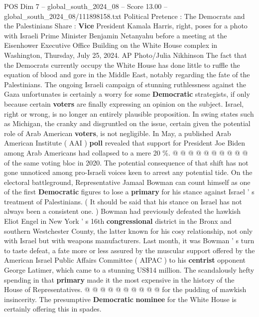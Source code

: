 \begin{textsample}{POS Dim 7 – global\_south\_2024\_08 – Score 13.00 – global\_south\_2024\_08/111898158.txt}  \label{ex:f7_pos_180}
Political Pretence : The Democrats and the Palestinians Share : \textbf{Vice} President Kamala Harris, right, poses for a photo with Israeli Prime Minister Benjamin Netanyahu before a meeting at the Eisenhower Executive Office Building on the White House complex in Washington, Thursday, July 25, 2024.
AP Photo/Julia Nikhinson The fact that the Democrats currently occupy the White House has done little to ruffle the equation of blood and gore in the Middle East, notably regarding the fate of the Palestinians.
The ongoing Israeli campaign of stunning ruthlessness against the Gaza unfortunates is certainly a worry for some \textbf{Democratic} strategists, if only because certain \textbf{voters} are finally expressing an opinion on the subject.
Israel, right or wrong, is no longer an entirely plausible proposition.
In swing states such as Michigan, the cranky and disgruntled on the issue, certain given the potential role of Arab American \textbf{voters}, is not negligible.
In May, a published Arab American Institute ( AAI ) \textbf{poll} revealed that support for President Joe Biden among Arab Americans had collapsed to a mere 20 \%. @ @ @ @ @ @ @ @ @ @ of the same voting bloc in 2020.
The potential consequence of that shift has not gone unnoticed among pro-Israeli voices keen to arrest any potential tide.
On the electoral battleground, Representative Jamaal Bowman can count himself as one of the first \textbf{Democratic} figures to lose a \textbf{primary} for his stance against Israel ' s treatment of Palestinians. ( It should be said that his stance on Israel has not always been a consistent one. ) Bowman had previously defeated the hawkish Eliot Engel in New York ' s 16th \textbf{congressional} district in the Bronx and southern Westchester County, the latter known for his cosy relationship, not only with Israel but with weapons manufacturers.
Last month, it was Bowman ' s turn to taste defeat, a fate more or less assured by the muscular support offered by the American Israel Public Affairs Committee ( AIPAC ) to his \textbf{centrist} opponent George Latimer, which came to a stunning US\$14 million.
The scandalously hefty spending in that \textbf{primary} made it the most expensive in the history of the House of Representatives. @ @ @ @ @ @ @ @ @ @ for the pudding of mawkish insincerity.
The presumptive \textbf{Democratic} \textbf{nominee} for the White House is certainly offering this in spades.

\end{textsample}
